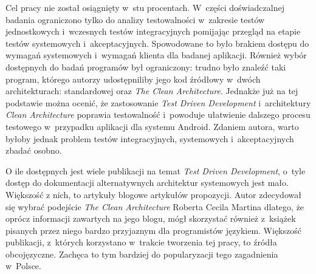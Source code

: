 Cel pracy nie został osiągnięty w~stu procentach. W~części doświadczalnej badania ograniczono tylko do analizy testowalności w~zakresie testów jednostkowych i~wczesnych testów integracyjnych pomijając przegląd na etapie testów systemowych i~akceptacyjnych. Spowodowane to było brakiem dostępu do wymagań systemowych i~wymagań klienta dla badanej aplikacji. Również wybór dostępnych do badań programów był ograniczony: trudno było znaleźć taki program, którego autorzy udostępniliby jego kod źródłowy w~dwóch architekturach: standardowej oraz \textit{The Clean Architecture}. Jednakże już na tej podstawie można ocenić, że zastosowanie \textit{Test Driven Development} i~architektury \textit{Clean Architecture} poprawia testowalność i~powoduje ułatwienie dalszego procesu testowego w~przypadku aplikacji dla systemu Android. Zdaniem autora, warto byłoby jednak problem testów integracyjnych, systemowych i~akceptacyjnych zbadać osobno.

O ile dostępnych jest wiele publikacji na temat \textit{Test Driven Development}, o~tyle dostęp do dokumentacji alternatywnych architektur systemowych jest mało. Większość z nich, to artykuły blogowe artykułów propozycji. Autor zdecydował się wybrać podejście \textit{The Clean Architecture} Roberta Cecila Martina dlatego, że oprócz informacji zawartych na jego blogu, mógł skorzystać również z~książek pisanych przez niego bardzo przyjaznym dla programistów językiem. Większość publikacji, z~których korzystano w~trakcie tworzenia tej pracy, to źródła obcojęzyczne. Zachęca to tym bardziej do popularyzacji tego zagadnienia w~Polsce.

